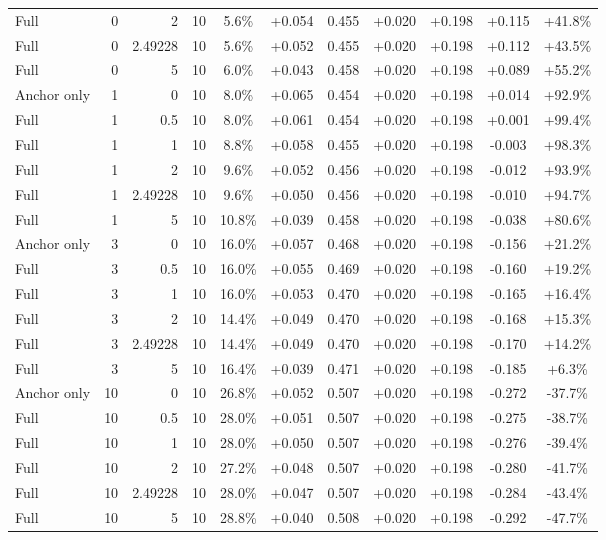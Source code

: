 \begin{table}[htbp]
\begin{tabular}{lrrrccccccc}
Full & 0 & 2 & 10 & 5.6\% & +0.054 & 0.455 & +0.020 & +0.198 & +0.115 & +41.8\% \\
Full & 0 & 2.49228 & 10 & 5.6\% & +0.052 & 0.455 & +0.020 & +0.198 & +0.112 & +43.5\% \\
Full & 0 & 5 & 10 & 6.0\% & +0.043 & 0.458 & +0.020 & +0.198 & +0.089 & +55.2\% \\
Anchor only & 1 & 0 & 10 & 8.0\% & +0.065 & 0.454 & +0.020 & +0.198 & +0.014 & +92.9\% \\
Full & 1 & 0.5 & 10 & 8.0\% & +0.061 & 0.454 & +0.020 & +0.198 & +0.001 & +99.4\% \\
Full & 1 & 1 & 10 & 8.8\% & +0.058 & 0.455 & +0.020 & +0.198 & -0.003 & +98.3\% \\
Full & 1 & 2 & 10 & 9.6\% & +0.052 & 0.456 & +0.020 & +0.198 & -0.012 & +93.9\% \\
Full & 1 & 2.49228 & 10 & 9.6\% & +0.050 & 0.456 & +0.020 & +0.198 & -0.010 & +94.7\% \\
Full & 1 & 5 & 10 & 10.8\% & +0.039 & 0.458 & +0.020 & +0.198 & -0.038 & +80.6\% \\
Anchor only & 3 & 0 & 10 & 16.0\% & +0.057 & 0.468 & +0.020 & +0.198 & -0.156 & +21.2\% \\
Full & 3 & 0.5 & 10 & 16.0\% & +0.055 & 0.469 & +0.020 & +0.198 & -0.160 & +19.2\% \\
Full & 3 & 1 & 10 & 16.0\% & +0.053 & 0.470 & +0.020 & +0.198 & -0.165 & +16.4\% \\
Full & 3 & 2 & 10 & 14.4\% & +0.049 & 0.470 & +0.020 & +0.198 & -0.168 & +15.3\% \\
Full & 3 & 2.49228 & 10 & 14.4\% & +0.049 & 0.470 & +0.020 & +0.198 & -0.170 & +14.2\% \\
Full & 3 & 5 & 10 & 16.4\% & +0.039 & 0.471 & +0.020 & +0.198 & -0.185 & +6.3\% \\
Anchor only & 10 & 0 & 10 & 26.8\% & +0.052 & 0.507 & +0.020 & +0.198 & -0.272 & -37.7\% \\
Full & 10 & 0.5 & 10 & 28.0\% & +0.051 & 0.507 & +0.020 & +0.198 & -0.275 & -38.7\% \\
Full & 10 & 1 & 10 & 28.0\% & +0.050 & 0.507 & +0.020 & +0.198 & -0.276 & -39.4\% \\
Full & 10 & 2 & 10 & 27.2\% & +0.048 & 0.507 & +0.020 & +0.198 & -0.280 & -41.7\% \\
Full & 10 & 2.49228 & 10 & 28.0\% & +0.047 & 0.507 & +0.020 & +0.198 & -0.284 & -43.4\% \\
Full & 10 & 5 & 10 & 28.8\% & +0.040 & 0.508 & +0.020 & +0.198 & -0.292 & -47.7\% \\

\end{tabular}
\end{table}
